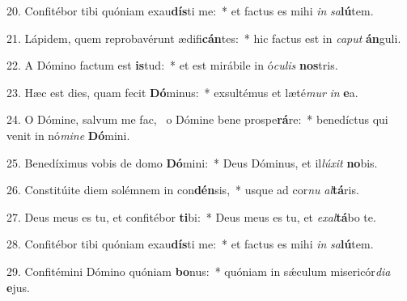 20. Confitébor tibi quóniam exau\textbf{dís}ti me:~*  et factus es mihi \textit{in} \textit{sa}\textbf{lú}tem.\

21. Lápidem, quem reprobavérunt ædifi\textbf{cán}tes:~*  hic factus est in \textit{ca}\textit{put} \textbf{án}guli.\

22. A Dómino factum est \textbf{is}tud:~*  et est mirábile in ó\textit{cu}\textit{lis} \textbf{nos}tris.\

23. Hæc est dies, quam fecit \textbf{Dó}minus:~*  exsultémus et læté\textit{mur} \textit{in} \textbf{e}a.\

24. O Dómine, salvum me fac, \dag\  o Dómine bene prospe\textbf{rá}re:~*  benedíctus qui venit in nó\textit{mi}\textit{ne} \textbf{Dó}mini.\

25. Benedíximus vobis de domo \textbf{Dó}mini:~*  Deus Dóminus, et il\textit{lú}\textit{xit} \textbf{no}bis.\

26. Constitúite diem solémnem in con\textbf{dén}sis,~*  usque ad cor\textit{nu} \textit{al}\textbf{tá}ris.\

27. Deus meus es tu, et confitébor \textbf{ti}bi:~*  Deus meus es tu, et \textit{ex}\textit{al}\textbf{tá}bo te.\

28. Confitébor tibi quóniam exau\textbf{dís}ti me:~*  et factus es mihi \textit{in} \textit{sa}\textbf{lú}tem.\

29. Confitémini Dómino quóniam \textbf{bo}nus:~*  quóniam in sǽculum misericór\textit{di}\textit{a} \textbf{e}jus.\

